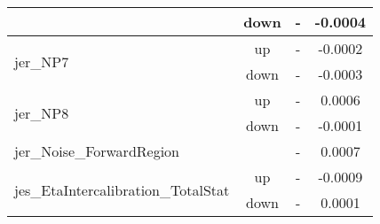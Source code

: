 \begin{table}[h!]
\begin{tabular}{lccc}
                                       & down &   -    &     -0.0004       \\ \hline
\multirow{2}{*}{jer\_NP7}      & up   &     -     &     -0.0002      \\
                                       & down &        -    &     -0.0003       \\ \hline
\multirow{2}{*}{jer\_NP8}      & up   &     -    &     0.0006      \\
                                       & down &        -     &     -0.0001       \\ \hline
\multirow{2}{*}{jer\_Noise\_ForwardRegion}  &  &  \multirow{2}{*}{-}  & \multirow{2}{*}{0.0007}  \\  \\ \hline
\multirow{2}{*}{jes\_EtaIntercalibration\_TotalStat}      & up   &       -     &     -0.0009      \\
                                       & down &     -     &        0.0001       \\ \hline
\end{tabular}
\end{table}




